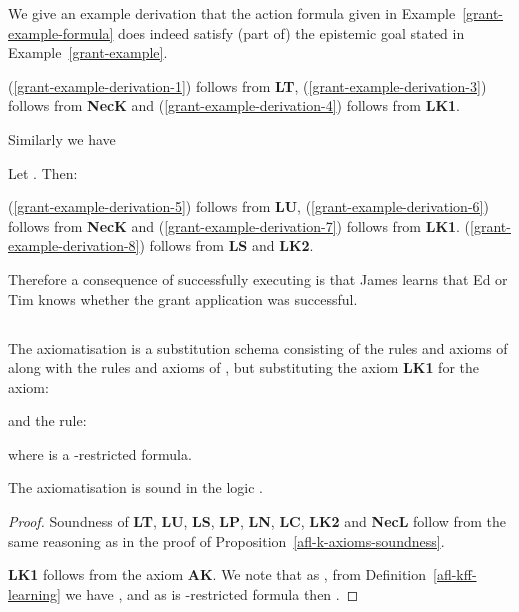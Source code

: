 \documentclass[twoside]{aiml14}
\begin{document}
  \begin{example}\label{grant-example-derivation}
      We give an example derivation that the action formula  given in
      Example~\ref{grant-example-formula} does indeed satisfy (part of) the
      epistemic goal stated in Example~\ref{grant-example}.
      
      (\ref{grant-example-derivation-1}) follows from {\bf LT},
      (\ref{grant-example-derivation-3}) follows from {\bf NecK} and
      (\ref{grant-example-derivation-4}) follows from {\bf LK1}.

      Similarly we have 
      

      Let . Then:
      
      (\ref{grant-example-derivation-5}) follows from {\bf LU},
      (\ref{grant-example-derivation-6}) follows from {\bf NecK} and
      (\ref{grant-example-derivation-7}) follows from {\bf LK1}.
      (\ref{grant-example-derivation-8}) follows from {\bf LS} and {\bf LK2}.

      Therefore a consequence of successfully executing  is that James
      learns that Ed or Tim knows whether the grant application was successful.
  \end{example}

  \subsection{\classKFF{}}

  \begin{definition}\label{afl-kff-axioms}
      The axiomatisation \axiomAflKFF{} is a substitution schema consisting of the
      rules and axioms of \axiomKFF{} 
      along with the rules and axioms of \axiomAflK{},
      but substituting the \axiomAflK{} axiom {\bf LK1} for the axiom:
      
      and the rule:
      
      where  is a -restricted formula.
  \end{definition}

  \begin{proposition}\label{afl-kff-axioms-soundness}
      The axiomatisation \axiomAflKFF{} is sound in the logic \logicAmlKFF{}.
  \end{proposition}

  \begin{proof}
      Soundness of {\bf LT}, {\bf LU}, {\bf LS}, {\bf LP}, {\bf LN}, {\bf LC},
      {\bf LK2} and {\bf NecL} follow from the same reasoning as in the proof
      of Proposition~\ref{afl-k-axioms-soundness}.

      {\bf LK1} follows from the \axiomAmlKFF{} axiom {\bf AK}.
      We note that as , from Definition~\ref{afl-kff-learning}
      we have ,
      and as  is -restricted formula then
      .
  \end{proof}
\end{document}
